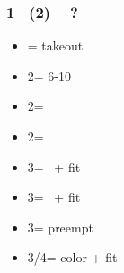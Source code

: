 \documentclass[12pt, a4paper]{article}
\begin{document}
\subsubsection*{1\hearts -- (2\diams) -- ?}
\begin{itemize}
    \item \dbl = takeout
    \item 2\hearts = 6-10
    \item 2\spades = \fonce
    \item 2\nt = \clubs \invp
    \item 3\clubs = \gf\ + fit
    \item 3\diams = \inv\ + fit
    \item 3\hearts = preempt
    \item 3\spades/4\clubs = color + fit
\end{itemize}

\end{document}
